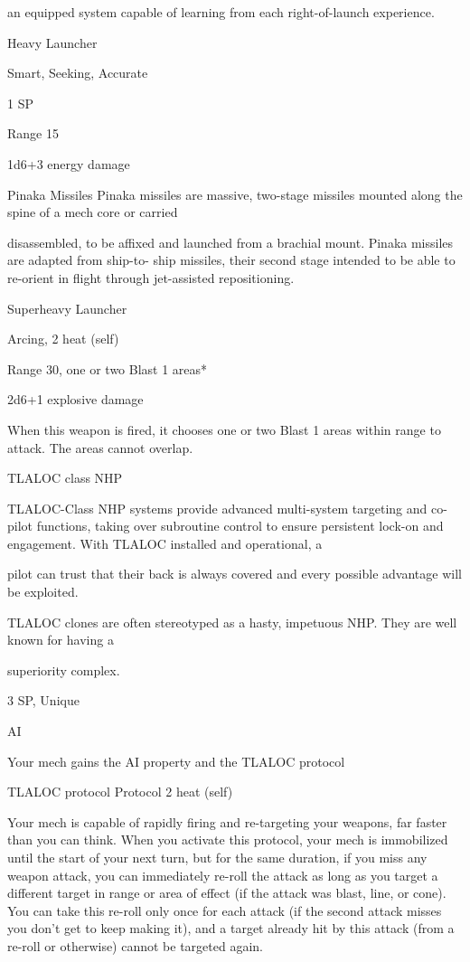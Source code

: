 an equipped system capable of learning from each right-of-launch experience.     

Heavy Launcher
 
Smart, Seeking, Accurate
 
1 SP
 
Range 15
 
1d6+3 energy damage
 

Pinaka Missiles  
Pinaka missiles are massive, two-stage missiles mounted along the spine of a mech core or carried  

disassembled, to be affixed and launched from a brachial mount.  Pinaka missiles are adapted from ship-to- 
ship missiles, their second stage intended to be able to re-orient in flight through jet-assisted repositioning.   

Superheavy Launcher
 
Arcing, 2 heat (self)
 

                                                                                                               


Range 30, one or two Blast 1 areas* 
 
2d6+1 explosive damage
 
When this weapon is fired, it chooses one or two Blast 1 areas within range to attack. The areas  
cannot overlap.
 

TLALOC class NHP  

TLALOC-Class NHP systems provide advanced multi-system targeting and co-pilot functions, taking over  
subroutine control to ensure persistent lock-on and engagement. With TLALOC installed and operational, a  

pilot can trust that their back is always covered and every possible advantage will be exploited.   

TLALOC clones are often stereotyped as a hasty, impetuous NHP. They are well known for having a  

superiority complex.  

3 SP, Unique
 

AI
 
Your mech gains the AI property and the TLALOC protocol
 

TLALOC protocol  
Protocol  
2 heat (self)
 
Your mech is capable of rapidly firing and re-targeting your weapons, far faster than you can  
think. When you activate this protocol, your mech is immobilized until the start of your next turn,  
but for the same duration, if you miss any weapon attack, you can immediately re-roll the attack  
as long as you target a different target in range or area of effect (if the attack was blast, line, or  
cone). You can take this re-roll only once for each attack (if the second attack misses you don’t  
get to keep making it), and a target already hit by this attack (from a re-roll or otherwise) cannot  
be targeted again.
 

                                                                                                                     
